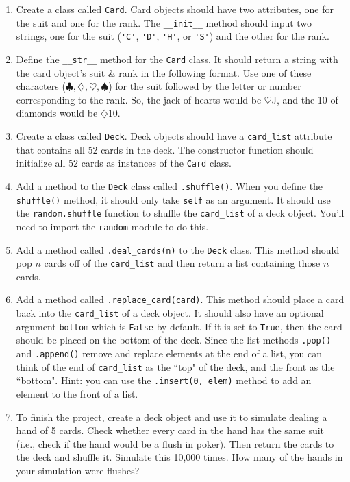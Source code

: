 \documentclass[12pt]{article}
\begin{document}
\begin{enumerate}

\item Create a class called \verb|Card|.  Card objects should have two attributes, one for the suit and one for the rank.  The \verb|__init__| method should input two strings, one for the suit (\verb|'C'|, \verb|'D'|, \verb|'H'|, or \verb|'S'|) and the other for the rank. 

\item Define the \verb|__str__| method for the \verb|Card| class.  It should return a string with the card object's suit \& rank in the following format.  Use one of these characters ($\clubsuit, \diamondsuit, \heartsuit, \spadesuit$) for the suit followed by the letter or number corresponding to the rank.  So, the jack of hearts would be $\heartsuit$J, and the 10 of diamonds would be $\diamondsuit$10. 

\item Create a class called \verb|Deck|. Deck objects should have a \verb|card_list| attribute that contains all 52 cards in the deck.  The constructor function should initialize all 52 cards as instances of the \verb|Card| class. 

\item Add a method to the \verb|Deck| class called \verb|.shuffle()|. When you define the \verb|shuffle()| method, it should only take \verb|self| as an argument. It should use the \verb|random.shuffle| function to shuffle the \verb|card_list| of a deck object.  You'll need to import the \verb|random| module to do this. 

\item Add a method called \verb|.deal_cards(n)| to the \verb|Deck| class.  This method should pop $n$ cards off of the \verb|card_list| and then return a list containing those $n$ cards.  

\item Add a method called \verb|.replace_card(card)|.  This method should place a card back into the \verb|card_list| of a deck object.  It should also have an optional argument \verb|bottom| which is \verb|False| by default.  If it is set to \verb|True|, then the card should be placed on the bottom of the deck. Since the list methods \verb|.pop()| and \verb|.append()| remove and replace elements at the end of a list, you can think of the end of \verb|card_list| as the ``top" of the deck, and the front as the ``bottom".  Hint: you can use the \verb|.insert(0, elem)| method to add an element to the front of a list. 

\item To finish the project, create a deck object and use it to simulate dealing a hand of 5 cards. Check whether every card in the hand has the same suit (i.e., check if the hand would be a flush in poker).  Then return the cards to the deck and shuffle it.  Simulate this 10{,}000 times.  How many of the hands in your simulation were flushes?  



\end{enumerate}
\end{document}
